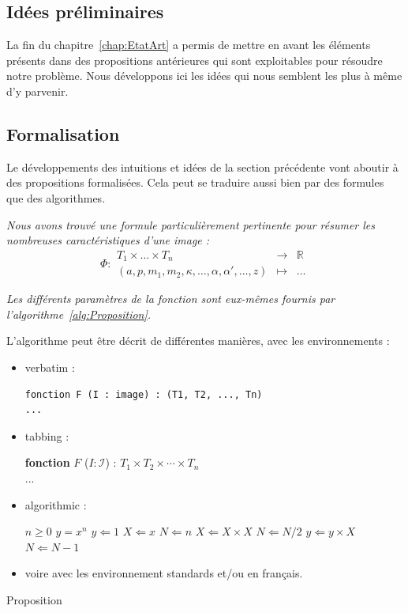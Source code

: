\documentclass[11pt, french]{report-rd-info}
\begin{document}
\subsection{Idées préliminaires}

La fin du chapitre~\ref{chap:EtatArt} a permis de mettre en avant les éléments présents dans des propositions antérieures qui sont exploitables pour résoudre notre problème. Nous développons ici les idées qui nous semblent les plus à même d'y parvenir.

\subsection{Formalisation}

Le développements des intuitions et idées de la section précédente vont aboutir à des propositions formalisées. Cela peut se traduire aussi bien par des formules que des algorithmes.

\emph{Nous avons trouvé une formule particulièrement pertinente pour résumer les nombreuses caractéristiques d'une image :}
\begin{equation}
	\label{eq:Proposition}
	\Phi :
		\begin{array}{ccc}
			T_1 \times \ldots \times T_n & \to & \mathbb{R}\\
			(a, p, m_1, m_2, \kappa, \ldots, \alpha, \alpha', \ldots,z) & \mapsto & \ldots
		\end{array}
\end{equation}

\emph{Les différents paramètres de la fonction sont eux-mêmes fournis par l'algorithme~\ref{alg:Proposition}.}

\begin{algorithm*}
	L'algorithme peut être décrit de différentes manières, avec les environnements :
	\begin{itemize}
		\item verbatim :
			\begin{verbatim}
fonction F (I : image) : (T1, T2, ..., Tn)
...
			\end{verbatim}
		\item tabbing :
			\begin{tabbing}
				\textbf{fonction} $F$ ($I : \mathcal{I}$) : $T_1 \times T_2 \times \cdots \times T_n$\\
				...
			\end{tabbing}
		\item algorithmic :
			\begin{algorithmic}[1]
				\REQUIRE $n \geq 0$
				\ENSURE $y = x^n$
				\STATE $y \Leftarrow 1$
				\STATE $X \Leftarrow x$
				\STATE $N \Leftarrow n$
						\STATE $X \Leftarrow X \times X$
						\STATE $N \Leftarrow N / 2$
					\ELSE[$N$ is odd]
						\STATE $y \Leftarrow y \times X$
						\STATE $N \Leftarrow N - 1$
					\ENDIF
				\ENDWHILE
			\end{algorithmic}
		\item voire avec les environnement standards et/ou en français.
	\end{itemize}
	\caption{Proposition}
	\label{alg:Proposition}
\end{algorithm*}
\end{document}
